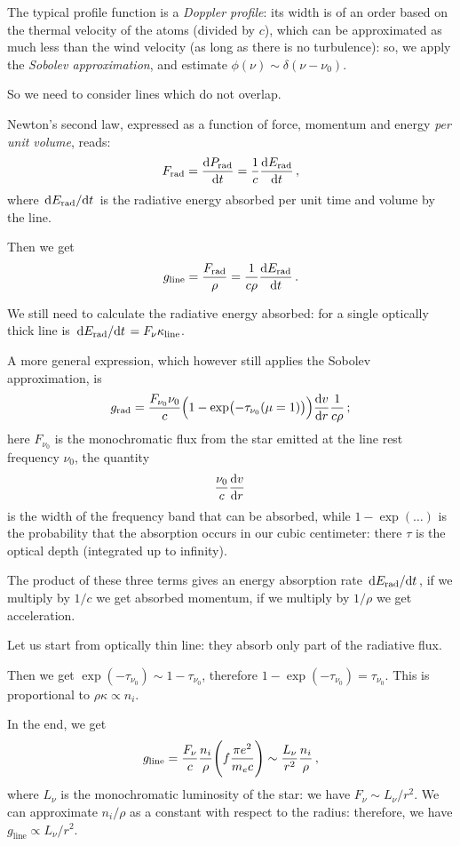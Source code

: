 \documentclass[main.tex]{subfiles}
\begin{document}
The typical profile function is a \emph{Doppler profile}: its width is of an order based on the thermal velocity of the atoms (divided by \(c\)), which can be approximated as much less than the wind velocity (as long as there is no turbulence): so, we apply the \emph{Sobolev approximation}, and estimate \(\phi (\nu ) \sim \delta (\nu - \nu_0 )\). 

So we need to consider lines which do not overlap. 

Newton's second law, expressed as a function of force, momentum and energy \emph{per unit volume}, reads: 
%
\begin{align}
  F _{\text{rad}} = \dv{P _{\text{rad}}}{t} 
  = \frac{1}{c} \dv{E _{\text{rad}}}{t}
\,,
\end{align}
%
where \(\dv*{E _{\text{rad}}}{t}\) is the radiative energy absorbed per unit time and volume by the line.

Then we get 
%
\begin{align}
  g _{\text{line}} = \frac{F _{\text{rad}}}{\rho }
  = \frac{1}{c \rho } \dv{E _{\text{rad}}}{t}
\,.
\end{align}
 
We still need to calculate the radiative energy absorbed: for a single optically thick line is \(\dv*{E _{\text{rad}}}{t} = F_{\nu } \kappa _{\text{line}}\).

A more general expression, which however still applies the Sobolev approximation, is 
%
\begin{align}
  g _{\text{rad}} = \frac{F_{\nu_0} \nu_0 }{c} \qty(1 - \exp(- \tau_{\nu_0 } (\mu=1)) ) \dv{v}{r} \frac{1}{c \rho }
\,;
\end{align}
%
here \(F_{\nu_0}\) is the monochromatic flux from the star emitted at the line rest frequency \(\nu_0 \), the quantity 
%
\begin{align}
  \frac{\nu_0}{c} \dv{v}{r} 
\,
\end{align}
%
is the width of the frequency band that can be absorbed, while \(1 - \exp(\dots) \) is the probability that the absorption occurs in our cubic centimeter: there \(\tau \) is the optical depth (integrated up to infinity).

The product of these three terms gives an energy absorption rate \(\dv*{E _{\text{rad}}}{t}\), if we multiply by \(1/c\) we get absorbed momentum, if we multiply by \(1/ \rho \) we get acceleration.

Let us start from optically thin line: they absorb only part of the radiative flux.

Then we get \(\exp(-\tau_{\nu_0 }) \sim 1- \tau_{\nu_0 } \), therefore \(1- \exp(-\tau_{\nu_0 }) = \tau_{\nu_0 } \).
This is proportional to \(\rho \kappa \propto n_i\).

In the end, we get 
%
\begin{align}
  g_{\text{line}} = \frac{F_{\nu }}{c} \frac{n_i}{\rho } \qty(f \frac{\pi e^2}{m_e c}) \sim \frac{L_{\nu }}{r^2} \frac{n_i}{\rho }
\,,
\end{align}
%
where \(L_{\nu }\) is the monochromatic luminosity of the star: we have \(F_{\nu } \sim L_{\nu }/ r^2\).
We can approximate \(n_i / \rho \) as a constant with respect to the radius: therefore, we have \(g _{\text{line}} \propto L_{\nu } / r^2\).
\end{document}
